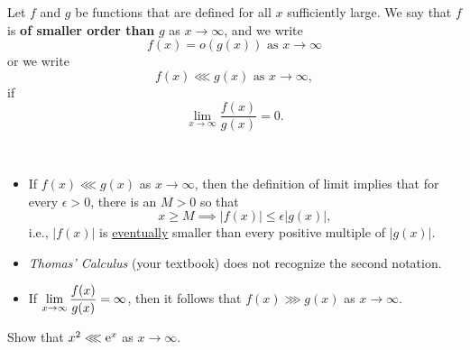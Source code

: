\begin{definition}
Let $f$ and $g$ be functions that are defined for all $x$ sufficiently large.
We say that $f$ is \textbf{of smaller order than} $g$ as $x\to \infty$, and we write
\begin{equation*}
f(x) = o(g(x)) \text{ as } x\to \infty
\end{equation*}
or we write
\begin{equation*}
f(x) \lll g(x) \text{ as } x\to\infty,
\end{equation*}
if
\begin{equation*}
\lim_{x\to\infty}\frac{f(x)}{g(x)} = 0.
\end{equation*}
\end{definition}

\begin{remark}\,
\begin{itemize}
\item If $f(x)\lll g(x)$ as $x\to\infty$, then the definition of limit implies that for every $\epsilon>0$, there is an $M>0$ so that
\begin{equation*}
x\ge M\implies |f(x)|\le \epsilon |g(x)|,
\end{equation*}
i.e., $|f(x)|$ is \underline{eventually} smaller than every positive multiple of $|g(x)|$.
\item \textit{Thomas' Calculus} (your textbook) does not recognize the second notation.
\item If $\displaystyle\lim_{x\to\infty}\frac{f(x)}{g(x)} = \infty$, then it follows that $f(x)\ggg g(x)$ as $x\to\infty$.
\end{itemize}
\end{remark}

\begin{example}
Show that $x^2\lll \mathrm{e}^x$ as $x\to\infty$.
\end{example}

\ifdefined\SOLUTION
{}
\fi
\vfill

